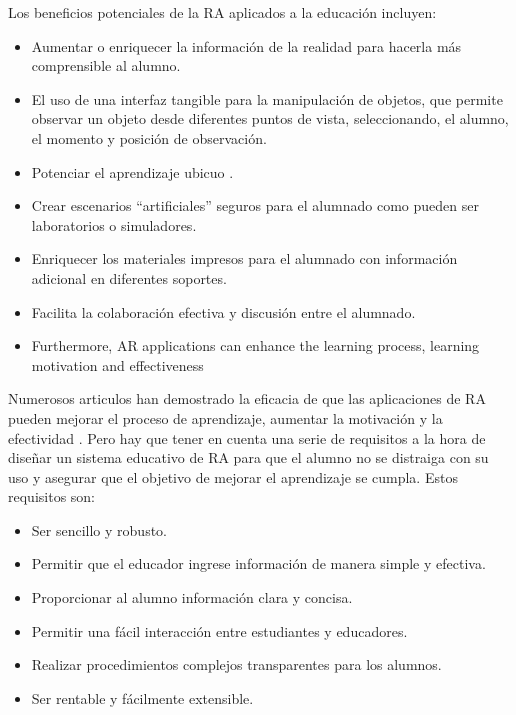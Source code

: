 Los beneficios potenciales de la RA aplicados a la educación incluyen:
\begin{itemize}

    \item Aumentar o enriquecer la información de la realidad para hacerla más comprensible al alumno.
    

    \item El uso de una interfaz tangible para la manipulación de objetos, que permite observar un objeto desde diferentes puntos de vista,
    seleccionando, el alumno, el momento y posición de observación.

    \item Potenciar el aprendizaje ubicuo \cite{URL::AprendizajeUbicuo}.
    
    \item Crear escenarios “artificiales” seguros para el alumnado
    como pueden ser laboratorios o simuladores. 

    \item Enriquecer los materiales impresos para el alumnado con información adicional en diferentes soportes.
    
    \item Facilita la colaboración efectiva y discusión entre el alumnado.
    \item 
    Furthermore, AR applications can enhance the learning process, learning motivation and effectiveness
\end{itemize}

Numerosos articulos han demostrado la eficacia de que las aplicaciones de RA pueden mejorar el proceso de aprendizaje, aumentar la motivación y la efectividad \cite{URL::animationeco} \cite{URL::ar2}. Pero hay que tener en cuenta una serie de requisitos a la hora de diseñar un sistema educativo de RA para que el alumno no se distraiga con su uso y asegurar que el objetivo de mejorar el aprendizaje se cumpla. Estos requisitos son:

\begin{itemize}
    \item Ser sencillo y robusto.
    \item Permitir que el educador ingrese información de manera simple y efectiva.
    \item Proporcionar al alumno información clara y concisa.
    \item Permitir una fácil interacción entre estudiantes y educadores.
    \item Realizar procedimientos complejos transparentes para los alumnos.
    \item Ser rentable y fácilmente extensible.
\end{itemize}


